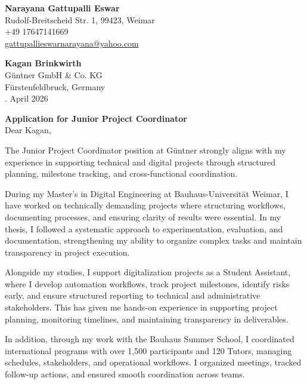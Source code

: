 \documentclass[11pt]{report}
\begin{document}
\raggedright \textbf{Narayana Gattupalli Eswar} \\ 
Rudolf-Breitscheid Str. 1, 99423, Weimar \\ 
+49 17647141669 \\ 
\href{mailto:gattupallieswarnarayana@yahoo.com}
{gattupallieswarnarayana@yahoo.com}\\

\vspace{0.3em}

\raggedright \textbf{Kagan Brinkwirth}\\ Güntner GmbH \& Co. KG\\
Fürstenfeldbruck, Germany\\

. April 2026

\raggedright\textbf{Application for Junior Project Coordinator}\\

\vspace{0.3em}
Dear Kagan,

\justifying\setlength{\parindent}{0pt}

The Junior Project Coordinator position at Güntner strongly aligns with my experience in supporting technical and digital projects through structured planning, milestone tracking, and cross-functional coordination.

During my Master’s in Digital Engineering at Bauhaus-Universität Weimar, I have worked on technically demanding projects where structuring workflows, documenting processes, and ensuring clarity of results were essential. In my thesis, I followed a systematic approach to experimentation, evaluation, and documentation, strengthening my ability to organize complex tasks and maintain transparency in project execution.

Alongside my studies, I support digitalization projects as a Student Assistant, where I develop automation workflows, track project milestones, identify risks early, and ensure structured reporting to technical and administrative stakeholders. This has given me hands-on experience in supporting project planning, monitoring timelines, and maintaining transparency in deliverables.

In addition, through my work with the Bauhaus Summer School, I coordinated international programs with over 1,500 participants and 120 Tutors, managing schedules, stakeholders, and operational workflows. I organized meetings, tracked follow-up actions, and ensured smooth coordination across teams.
\end{document}
